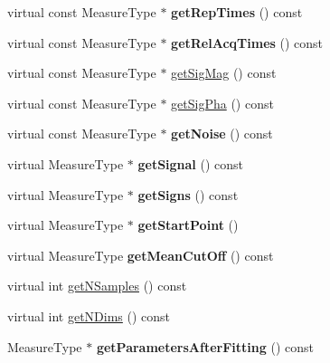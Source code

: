 \begin{DoxyCompactItemize}
\item 
virtual const Measure\+Type $\ast$ {\bfseries get\+Rep\+Times} () const \hypertarget{class_ox_1_1_calculator_a2e708f33e09e1e08345bea3024e99ec1}{}\label{class_ox_1_1_calculator_a2e708f33e09e1e08345bea3024e99ec1}

\item 
virtual const Measure\+Type $\ast$ {\bfseries get\+Rel\+Acq\+Times} () const \hypertarget{class_ox_1_1_calculator_a6698aa9563e9c7d251d4ff73810dd12c}{}\label{class_ox_1_1_calculator_a6698aa9563e9c7d251d4ff73810dd12c}

\item 
virtual const Measure\+Type $\ast$ \hyperlink{class_ox_1_1_calculator_ad9a623ee2bfc77732fa891c47c087aa9}{get\+Sig\+Mag} () const 
\item 
virtual const Measure\+Type $\ast$ \hyperlink{class_ox_1_1_calculator_acf6021ef084c24636a344a12627caff5}{get\+Sig\+Pha} () const 
\item 
virtual const Measure\+Type $\ast$ {\bfseries get\+Noise} () const \hypertarget{class_ox_1_1_calculator_abff843bf55042e78ce613caceef8e6a3}{}\label{class_ox_1_1_calculator_abff843bf55042e78ce613caceef8e6a3}

\item 
virtual Measure\+Type $\ast$ {\bfseries get\+Signal} () const \hypertarget{class_ox_1_1_calculator_a10c8a3e18079c680cbdf54366d5dfed0}{}\label{class_ox_1_1_calculator_a10c8a3e18079c680cbdf54366d5dfed0}

\item 
virtual Measure\+Type $\ast$ {\bfseries get\+Signs} () const \hypertarget{class_ox_1_1_calculator_ac05783e37c8e6f3f457778ebbfa2e6a5}{}\label{class_ox_1_1_calculator_ac05783e37c8e6f3f457778ebbfa2e6a5}

\item 
virtual Measure\+Type $\ast$ {\bfseries get\+Start\+Point} ()\hypertarget{class_ox_1_1_calculator_aebf55897e1f11cdd3afec75d24c8ea13}{}\label{class_ox_1_1_calculator_aebf55897e1f11cdd3afec75d24c8ea13}

\item 
virtual Measure\+Type {\bfseries get\+Mean\+Cut\+Off} () const \hypertarget{class_ox_1_1_calculator_a8232921e636ebc91a102bc2e95596a7b}{}\label{class_ox_1_1_calculator_a8232921e636ebc91a102bc2e95596a7b}

\item 
virtual int \hyperlink{class_ox_1_1_calculator_a5e5b6e1af84b8713c833a25d7c0dd90d}{get\+N\+Samples} () const 
\item 
virtual int \hyperlink{class_ox_1_1_calculator_a3a4266dedca7e02707e732a312b85048}{get\+N\+Dims} () const 
\item 
Measure\+Type $\ast$ {\bfseries get\+Parameters\+After\+Fitting} () const \hypertarget{class_ox_1_1_calculator_ac6818c17c5c145ef7db86d65d7348281}{}\label{class_ox_1_1_calculator_ac6818c17c5c145ef7db86d65d7348281}


\end{DoxyCompactItemize}
